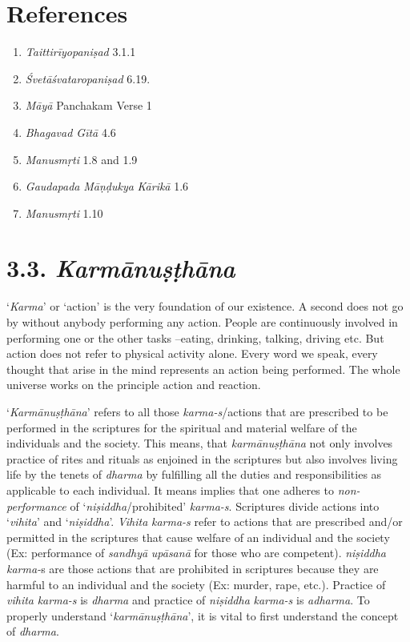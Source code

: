\section*{References}

\begin{enumerate}
\itemsep=0pt
\item
  \emph{Taittirīyopaniṣad} 3.1.1
\item
  \emph{Śvetāśvataropaniṣad} 6.19.
\item
  \emph{Māyā} Panchakam Verse 1
\item
  \emph{Bhagavad Gītā} 4.6
\item
  \emph{Manusmṛti} 1.8 and 1.9
\item
  \emph{Gaudapada} \emph{Māṇḍukya} \emph{Kārikā} 1.6
\item
  \emph{Manusmṛti} 1.10
\end{enumerate}
\newpage

\section*{3.3. \emph{Karmānuṣṭhāna}}

`\emph{Karma}' or `action' is the very foundation of our existence. A second does not go by without anybody performing any action. People are continuously involved in performing one or the other tasks --eating, drinking, talking, driving etc. But action does not refer to physical activity alone. Every word we speak, every thought that arise in the mind represents an action being performed. The whole universe works on the principle action and reaction.

`\emph{Karmānuṣṭhāna}' refers to all those \emph{karma-s}/actions that are prescribed to be performed in the scriptures for the spiritual and material welfare of the individuals and the society. This means, that \emph{karmānuṣṭhāna} not only involves practice of rites and rituals as enjoined in the scriptures but also involves living life by the tenets of \emph{dharma} by fulfilling all the duties and responsibilities as applicable to each individual. It means implies that one adheres to \emph{non-performance} of `\emph{niṣiddha}/prohibited' \emph{karma-s}. Scriptures divide actions into `\emph{vihita}' and `\emph{niṣiddha}'. \emph{Vihita} \emph{karma-s} refer to actions that are prescribed and/or permitted in the scriptures that cause welfare of an individual and the society (Ex: performance of \emph{sandhyā} \emph{upāsanā} for those who are competent). \emph{niṣiddha} \emph{karma-}s are those actions that are prohibited in scriptures because they are harmful to an individual and the society (Ex: murder, rape, etc.). Practice of \emph{vihita} \emph{karma-s} is \emph{dharma} and practice of \emph{niṣiddha} \emph{karma-s} is \emph{adharma}. To properly understand `\emph{karmānuṣṭhāna}', it is vital to first understand the concept of \emph{dharma}.

